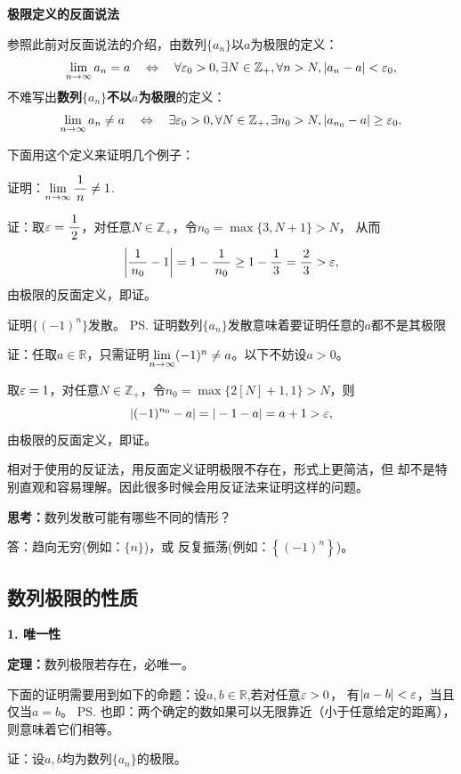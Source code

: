 \begin{shaded}
	{\bf 极限定义的反面说法}
	
	参照此前对反面说法的介绍，由数列$\{a_n\}$以$a$为极限的定义：
	$$\lim\limits_{n\to\infty} a_n= a\quad\Leftrightarrow\quad\forall\varepsilon_0>0,
	\exists N\in\mathbb{Z}_+,\forall n>N,|a_n-a|<\varepsilon_0,$$
	不难写出{\bf 数列$\{a_n\}$不以$a$为极限}的定义：
	$$\lim\limits_{n\to\infty} a_n\neq a\quad\Leftrightarrow\quad\exists\varepsilon_0>0,
	\forall N\in\mathbb{Z}_+,\exists n_0>N,|a_{n_0}-a|\geq\varepsilon_0.$$
	
	\bs
	下面用这个定义来证明几个例子：
	
	\egz 证明：$\lim\limits_{n\to\infty}\displaystyle\frac{\,{1}\,}{\,{n}\,}\neq 1$.
	
	证：取$\varepsilon=\displaystyle\frac{\,{1}\,}{\,{2}\,}$，对任意$N\in\mathbb{Z}_+$，令$n_0=\max\{3,N+1\}>N$，
	从而
	$$\left|\displaystyle\frac{\,{1}\,}{\,{n_0}\,}-1\right|=1-\displaystyle\frac{\,{1}\,}{\,{n_0}\,}\geq 1-\displaystyle\frac{\,{1}\,}{\,{3}\,}=\displaystyle\frac{\,{2}\,}{\,{3}\,}>\varepsilon,$$
	由极限的反面定义，即证。\fin
	
	\bs
	\egz 证明$\{(-1)^n\}$发散。
	\ps{证明数列$\{a_n\}$发散意味着要证明任意的$a$都不是其极限}
	
	证：任取$a\in\mathbb{R}$，只需证明$\lim\limits_{n\to\infty}(-1)^n\ne a$。以下不妨设$a>0$。
	
	取$\varepsilon=1$，对任意$N\in\mathbb{Z}_+$，令$n_0=\max\{2[N]+1,1\}>N$，则
	$$\left|(-1)^{n_0}-a\right|=|-1-a|=a+1>\varepsilon,$$
	由极限的反面定义，即证。\fin
	
	相对于使用的反证法，用反面定义证明极限不存在，形式上更简洁，但
	却不是特别直观和容易理解。因此很多时候会用反证法来证明这样的问题。
	
	\bs
	{\bf 思考：}数列发散可能有哪些不同的情形？

	\ifhint
	答：趋向无穷(例如：$\{n\}$)，或
	反复振荡(例如：$\left\{(-1)^n\right\}$)。
	\fi
\end{shaded}

\subsection{数列极限的性质}


{\bf 1. 唯一性}
\begin{thx}
	{\bf 定理：}数列极限若存在，必唯一。
\end{thx}

下面的证明需要用到如下的命题：设$a,b\in\mathbb{R}$,若对任意$\varepsilon>0$，
有$|a-b|<\varepsilon$，当且仅当$a=b$。
\ps{也即：两个确定的数如果可以无限靠近（小于任意给定的距离），
则意味着它们相等。}

证：设$a,b$均为数列$\{a_n\}$的极限。

